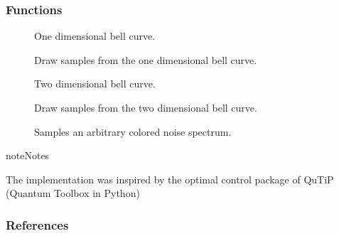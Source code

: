 \documentclass[letterpaper,10pt,english]{sphinxmanual}
\begin{document}
\subsubsection{Functions}
\label{\detokenize{qsim:id18}}\begin{description}
\item[{{\hyperref[\detokenize{qsim:qsim.noise.bell_curve_1dim}]{}}}] \leavevmode
One dimensional bell curve.

\item[{{\hyperref[\detokenize{qsim:qsim.noise.sample_1dim_gaussian_distribution}]{}}}] \leavevmode
Draw samples from the one dimensional bell curve.

\item[{{\hyperref[\detokenize{qsim:qsim.noise.bell_curve_2dim}]{}}}] \leavevmode
Two dimensional bell curve.

\item[{{\hyperref[\detokenize{qsim:qsim.noise.sample_2dim_gaussian_distribution}]{}}}] \leavevmode
Draw samples from the two dimensional bell curve.

\item[{{\hyperref[\detokenize{qsim:qsim.noise.fast_colored_noise}]{}}}] \leavevmode
Samples an arbitrary colored noise spectrum.

\end{description}

\begin{sphinxadmonition}{note}{Notes}

The implementation was inspired by the optimal control package of QuTiP 
(Quantum Toolbox in Python)
\end{sphinxadmonition}
\subsubsection*{References}
\end{document}

